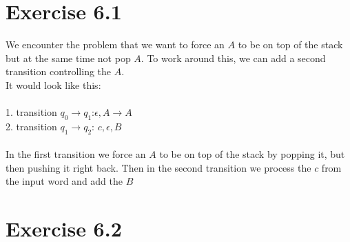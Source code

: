 \documentclass{article} %
\newcommand{\homeworkNumber}{6}
\begin{document}
\section*{Exercise \homeworkNumber.1}
We encounter the problem that we want to force an $A$ to be on top of the stack but at the same time not pop $A$.
To work around this, we can add a second transition controlling the $A$.\\
It would look like this:\\\\
1. transition $q_0 \to q_1$:\quad $\epsilon, A \to A$\\
2. transition $q_1 \to q_2$: \quad $c, \epsilon, B$\\\\
In the first transition we force an $A$ to be on top of the stack by popping it, but then pushing it right back. Then in the second transition we process the $c$ from the input word and add the $B$


\section*{Exercise \homeworkNumber.2}
\end{document}

